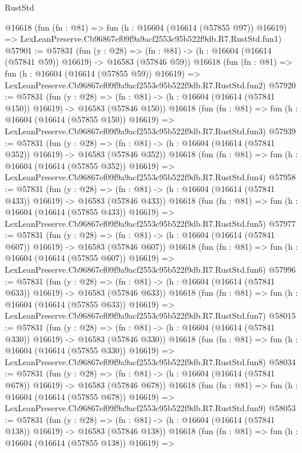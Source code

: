 \begin{lexlean}{RustStd}
\begin{coremodule}
    @16618
    (fun (fn : @81) =>
    fun (h : @16604 (@16614 (@57855 @97)) @16619) =>
    LexLeanPreserve.Cb96867ef09f9a9acf2553c95b522f9db.R7.RustStd.fun1)
@57901 := @57831
    (fun (y : @28) =>
    (fn : @81) -> (h : @16604 (@16614 (@57841 @59)) @16619) -> @16583 (@57846 @59))
    @16618
    (fun (fn : @81) =>
    fun (h : @16604 (@16614 (@57855 @59)) @16619) =>
    LexLeanPreserve.Cb96867ef09f9a9acf2553c95b522f9db.R7.RustStd.fun2)
@57920 := @57831
    (fun (y : @28) =>
    (fn : @81) -> (h : @16604 (@16614 (@57841 @150)) @16619) -> @16583 (@57846 @150))
    @16618
    (fun (fn : @81) =>
    fun (h : @16604 (@16614 (@57855 @150)) @16619) =>
    LexLeanPreserve.Cb96867ef09f9a9acf2553c95b522f9db.R7.RustStd.fun3)
@57939 := @57831
    (fun (y : @28) =>
    (fn : @81) -> (h : @16604 (@16614 (@57841 @352)) @16619) -> @16583 (@57846 @352))
    @16618
    (fun (fn : @81) =>
    fun (h : @16604 (@16614 (@57855 @352)) @16619) =>
    LexLeanPreserve.Cb96867ef09f9a9acf2553c95b522f9db.R7.RustStd.fun4)
@57958 := @57831
    (fun (y : @28) =>
    (fn : @81) -> (h : @16604 (@16614 (@57841 @433)) @16619) -> @16583 (@57846 @433))
    @16618
    (fun (fn : @81) =>
    fun (h : @16604 (@16614 (@57855 @433)) @16619) =>
    LexLeanPreserve.Cb96867ef09f9a9acf2553c95b522f9db.R7.RustStd.fun5)
@57977 := @57831
    (fun (y : @28) =>
    (fn : @81) -> (h : @16604 (@16614 (@57841 @607)) @16619) -> @16583 (@57846 @607))
    @16618
    (fun (fn : @81) =>
    fun (h : @16604 (@16614 (@57855 @607)) @16619) =>
    LexLeanPreserve.Cb96867ef09f9a9acf2553c95b522f9db.R7.RustStd.fun6)
@57996 := @57831
    (fun (y : @28) =>
    (fn : @81) -> (h : @16604 (@16614 (@57841 @633)) @16619) -> @16583 (@57846 @633))
    @16618
    (fun (fn : @81) =>
    fun (h : @16604 (@16614 (@57855 @633)) @16619) =>
    LexLeanPreserve.Cb96867ef09f9a9acf2553c95b522f9db.R7.RustStd.fun7)
@58015 := @57831
    (fun (y : @28) =>
    (fn : @81) -> (h : @16604 (@16614 (@57841 @330)) @16619) -> @16583 (@57846 @330))
    @16618
    (fun (fn : @81) =>
    fun (h : @16604 (@16614 (@57855 @330)) @16619) =>
    LexLeanPreserve.Cb96867ef09f9a9acf2553c95b522f9db.R7.RustStd.fun8)
@58034 := @57831
    (fun (y : @28) =>
    (fn : @81) -> (h : @16604 (@16614 (@57841 @678)) @16619) -> @16583 (@57846 @678))
    @16618
    (fun (fn : @81) =>
    fun (h : @16604 (@16614 (@57855 @678)) @16619) =>
    LexLeanPreserve.Cb96867ef09f9a9acf2553c95b522f9db.R7.RustStd.fun9)
@58053 := @57831
    (fun (y : @28) =>
    (fn : @81) -> (h : @16604 (@16614 (@57841 @138)) @16619) -> @16583 (@57846 @138))
    @16618
    (fun (fn : @81) =>
    fun (h : @16604 (@16614 (@57855 @138)) @16619) =>

\end{coremodule}
\end{lexlean}
